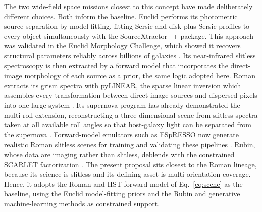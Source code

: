 \documentclass[10pt,onecolumn]{article}
\begin{document}
The two wide-field space missions closest to this concept have made deliberately different choices. Both inform the baseline. Euclid performs its photometric source separation by model fitting, fitting Sersic and disk-plus-Sersic profiles to every object simultaneously with the SourceXtractor++ package. This approach was validated in the Euclid Morphology Challenge, which showed it recovers structural parameters reliably across billions of galaxies \cite{sourcext2020,euclidmorph2023}. Its near-infrared slitless spectroscopy is then extracted by a forward model that incorporates the direct-image morphology of each source as a prior, the same logic adopted here. Roman extracts its grism spectra with pyLINEAR, the sparse linear inversion which assembles every transformation between direct-image sources and dispersed pixels into one large system \cite{linear2018,wang2021}. Its supernova program has already demonstrated the multi-roll extension, reconstructing a three-dimensional scene from slitless spectra taken at all available roll angles so that host-galaxy light can be separated from the supernova \cite{roman3d2026}. Forward-model emulators such as ESpRESSO now generate realistic Roman slitless scenes for training and validating these pipelines \cite{espresso2024}. Rubin, whose data are imaging rather than slitless, deblends with the constrained SCARLET factorization \cite{scarlet2018}. The present proposal sits closest to the Roman lineage, because its science is slitless and its defining asset is multi-orientation coverage. Hence, it adopts the Roman and HST forward model of Eq.~\eqref{eq:scene} as the baseline, using the Euclid model-fitting priors and the Rubin and generative machine-learning methods as constrained support.
\end{document}
